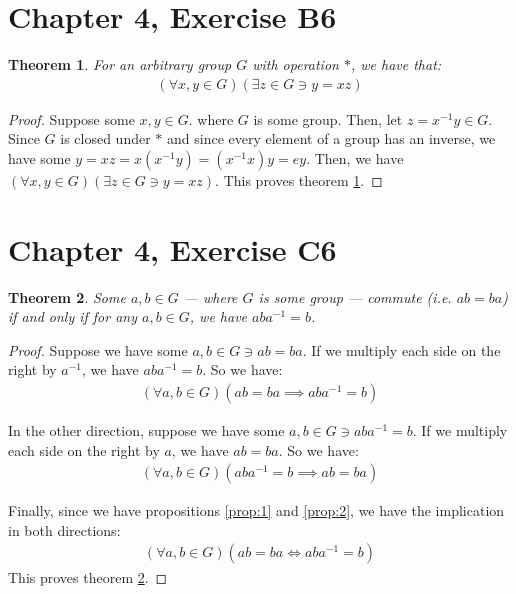 \documentclass[12pt]{article}
\newtheorem{thm}{Theorem}
\begin{document}
\section{Chapter 4, Exercise B6}

\begin{thm} \label{thm:3}
	For an arbitrary group $G$ with operation $*$, we have that:
	\begin{align}
		(\forall x, y \in G)(\exists z \in G \ni y = xz)
	\end{align}
\end{thm}

\begin{proof}
	Suppose some $x, y \in G$.
	where $G$ is some group.
	Then, let $z = x^{-1} y \in G$.
	Since $G$ is closed under $*$
	and since every element of a group has an inverse,
	we have some $y = xz = x (x^{-1}y)= (x^{-1} x)y = ey$.
	Then, we have $(\forall x, y \in G)(\exists z \in G \ni y = xz)$.
	This proves theorem \ref{thm:3}.
\end{proof}

\section{Chapter 4, Exercise C6}

\begin{thm} \label{thm:4}
	Some $a,b \in G$
	--- where $G$ is some group ---
	commute (i.e. $ab = ba$)
	if and only if
	for any $a,b \in G$, we have $aba^{-1} = b$.
\end{thm}

\begin{proof}
	Suppose we have some $a,b \in G \ni ab = ba$.
	If we multiply each side on the right by $a^{-1}$,
	we have $aba^{-1} = b$.
	So we have:
	\begin{align} \label{prop:1}
		(\forall a,b \in G)(ab = ba \implies aba^{-1} = b)
	\end{align}

	In the other direction, 
	suppose we have some $a,b \in G \ni aba^{-1} = b$.
	If we multiply each side on the right by $a$,
	we have $ab = ba$.
	So we have:
	\begin{align} \label{prop:2}
		(\forall a,b \in G)(aba^{-1} = b \implies ab = ba)
	\end{align}

	Finally, since we have propositions \ref{prop:1} and \ref{prop:2},
	we have the implication in both directions:
	\begin{align}
		(\forall a,b \in G)(ab = ba \iff aba^{-1} = b)
	\end{align}
	This proves theorem \ref{thm:4}.
\end{proof}
\end{document}
